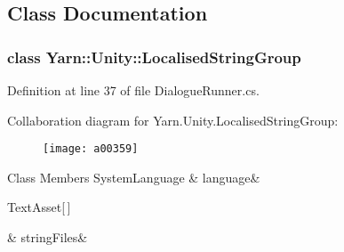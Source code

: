 \subsection{Class Documentation}
\label{a00353}
\hypertarget{a00129_a00353}{}
\subsubsection{class Yarn\-:\-:Unity\-:\-:Localised\-String\-Group}


Definition at line 37 of file Dialogue\-Runner.\-cs.



Collaboration diagram for Yarn.\-Unity.\-Localised\-String\-Group\-:
\nopagebreak
\begin{figure}[H]
\begin{center}
\leavevmode
\texttt{[image: a00359]}
\end{center}
\end{figure}
\begin{DoxyFields}{Class Members}
\hypertarget{a00129_a395d808fa32cb4fe68a62d7852534e1a}{System\-Language}\label{a00129_a395d808fa32cb4fe68a62d7852534e1a}
&
language&
\\
\hline

\hypertarget{a00129_a636624112fd57fedda96d485d20e6b9e}{Text\-Asset\mbox{[}$\,$\mbox{]}}\label{a00129_a636624112fd57fedda96d485d20e6b9e}
&
string\-Files&
\\
\hline

\end{DoxyFields}
